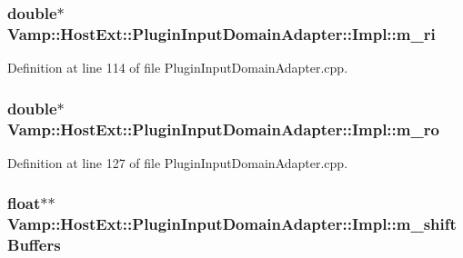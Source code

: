 \subsubsection[{\texorpdfstring{m\+\_\+ri}{m_ri}}]{\setlength{\rightskip}{0pt plus 5cm}double$\ast$ Vamp\+::\+Host\+Ext\+::\+Plugin\+Input\+Domain\+Adapter\+::\+Impl\+::m\+\_\+ri\hspace{0.3cm}{\ttfamily [protected]}}\hypertarget{class_vamp_1_1_host_ext_1_1_plugin_input_domain_adapter_1_1_impl_a0c379b5bf280b6db1cf8fe782c1a94bb}{}\label{class_vamp_1_1_host_ext_1_1_plugin_input_domain_adapter_1_1_impl_a0c379b5bf280b6db1cf8fe782c1a94bb}


Definition at line 114 of file Plugin\+Input\+Domain\+Adapter.\+cpp.

\subsubsection[{\texorpdfstring{m\+\_\+ro}{m_ro}}]{\setlength{\rightskip}{0pt plus 5cm}double$\ast$ Vamp\+::\+Host\+Ext\+::\+Plugin\+Input\+Domain\+Adapter\+::\+Impl\+::m\+\_\+ro\hspace{0.3cm}{\ttfamily [protected]}}\hypertarget{class_vamp_1_1_host_ext_1_1_plugin_input_domain_adapter_1_1_impl_a6407b3c17dc96ba7036f2161b1aa30cb}{}\label{class_vamp_1_1_host_ext_1_1_plugin_input_domain_adapter_1_1_impl_a6407b3c17dc96ba7036f2161b1aa30cb}


Definition at line 127 of file Plugin\+Input\+Domain\+Adapter.\+cpp.

\subsubsection[{\texorpdfstring{m\+\_\+shift\+Buffers}{m_shiftBuffers}}]{\setlength{\rightskip}{0pt plus 5cm}float$\ast$$\ast$ Vamp\+::\+Host\+Ext\+::\+Plugin\+Input\+Domain\+Adapter\+::\+Impl\+::m\+\_\+shift\+Buffers\hspace{0.3cm}{\ttfamily [protected]}}\hypertarget{class_vamp_1_1_host_ext_1_1_plugin_input_domain_adapter_1_1_impl_aa80cb3abdd1178318b8a7a7542a358a3}{}\label{class_vamp_1_1_host_ext_1_1_plugin_input_domain_adapter_1_1_impl_aa80cb3abdd1178318b8a7a7542a358a3}


